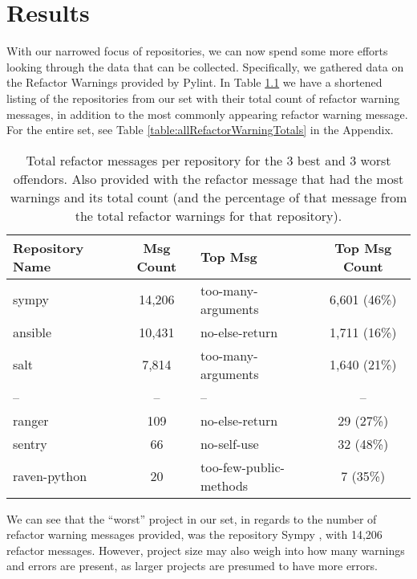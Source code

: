 \chapter{Results} \label{chapterResults}


With our narrowed focus of repositories, we can now spend some more efforts looking through the data that can be collected. Specifically, we gathered data on the Refactor Warnings provided by Pylint. In Table \ref{table:smallRefactorWarningTotals} we have a shortened listing of the repositories from our set with their total count of refactor warning messages, in addition to the most commonly appearing refactor warning message. For the entire set, see Table \ref{table:allRefactorWarningTotals} in the Appendix.

\begin{table}[ht]
  \small
  \centering
  \begin{tabularx}{0.8\textwidth} {
    | l 
    | c
    | >{\centering\arraybackslash}X 
    | c |
  }
    \hline
    Repository Name & Msg Count & Top Msg & Top Msg Count \\
    \hline\hline
    sympy & 14,206 & too-many-arguments & 6,601 (46\%) \\ \hline
    ansible &  10,431 & no-else-return & 1,711 (16\%) \\ \hline
    salt &  7,814 & too-many-arguments & 1,640 (21\%) \\ \hline
    -- & -- & -- & -- \\ \hline
    ranger & 109 & no-else-return & 29 (27\%) \\ \hline
    sentry & 66 & no-self-use & 32 (48\%) \\ \hline
    raven-python & 20 & too-few-public-methods & 7 (35\%) \\ \hline
  \end{tabularx}
  \caption{Total refactor messages per repository for the 3 best and 3 worst offendors. Also provided with the refactor message that had the most warnings and its total count (and the percentage of that message from the total refactor warnings for that repository).}
  \label{table:smallRefactorWarningTotals}
\end{table}

We can see that the ``worst'' project in our set, in regards to the number of refactor warning messages provided, was the repository Sympy \cite{data:sympy}, with 14,206 refactor messages. However, project size may also weigh into how many warnings and errors are present, as larger projects are presumed to have more errors.

